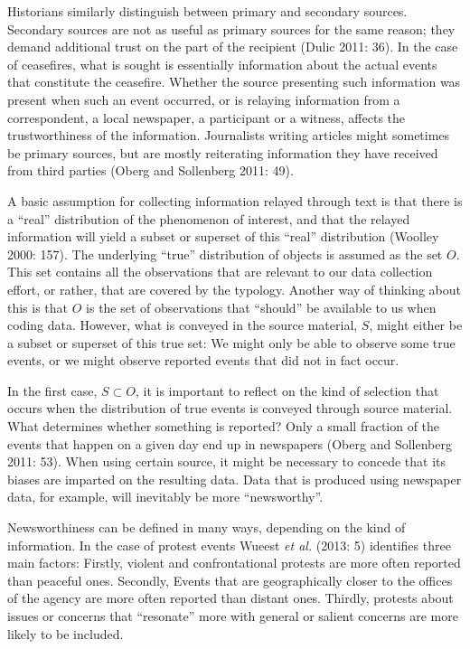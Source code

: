 \documentclass[12pt,twoside]{reedthesis}
\begin{document}
Historians similarly distinguish between primary and secondary sources.
Secondary sources are not as useful as primary sources for the same
reason; they demand additional trust on the part of the recipient (Dulic
2011: 36). In the case of ceasefires, what is sought is essentially
information about the actual events that constitute the ceasefire.
Whether the source presenting such information was present when such an
event occurred, or is relaying information from a correspondent, a local
newspaper, a participant or a witness, affects the trustworthiness of
the information. Journalists writing articles might sometimes be primary
sources, but are mostly reiterating information they have received from
third parties (Oberg and Sollenberg 2011: 49).

A basic assumption for collecting information relayed through text is
that there is a ``real'' distribution of the phenomenon of interest, and
that the relayed information will yield a subset or superset of this
``real'' distribution (Woolley 2000: 157). The underlying ``true''
distribution of objects is assumed as the set \(O\). This set contains
all the observations that are relevant to our data collection effort, or
rather, that are covered by the typology. Another way of thinking about
this is that \(O\) is the set of observations that ``should'' be
available to us when coding data. However, what is conveyed in the
source material, \(S\), might either be a subset or superset of this
true set: We might only be able to observe some true events, or we might
observe reported events that did not in fact occur.

In the first case, \(S \subset O\), it is important to reflect on the
kind of selection that occurs when the distribution of true events is
conveyed through source material. What determines whether something is
reported? Only a small fraction of the events that happen on a given day
end up in newspapers (Oberg and Sollenberg 2011: 53). When using certain
source, it might be necessary to concede that its biases are imparted on
the resulting data. Data that is produced using newspaper data, for
example, will inevitably be more ``newsworthy''.

Newsworthiness can be defined in many ways, depending on the kind of
information. In the case of protest events Wueest \emph{et al.} (2013:
5) identifies three main factors: Firstly, violent and confrontational
protests are more often reported than peaceful ones. Secondly, Events
that are geographically closer to the offices of the agency are more
often reported than distant ones. Thirdly, protests about issues or
concerns that ``resonate'' more with general or salient concerns are
more likely to be included.
\end{document}
